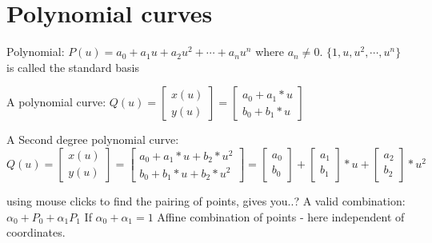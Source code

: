 \section{Polynomial curves}
Polynomial:
$P(u) = a_0 + a_1 u + a_2 u^2 + \cdots + a_nu^n$ where $a_n \not = 0$.
$\{1,u,u^2,\cdots,u^n\}$ is called the standard basis

A polynomial curve: $Q(u) = \begin{bmatrix} x(u) \\ y(u) \end{bmatrix} = \begin{bmatrix}  a_0 + a_1* u \\ b_0 + b_1*u  \end{bmatrix}$

A Second degree polynomial curve: $Q(u) = \begin{bmatrix} x(u) \\ y(u) \end{bmatrix} = \begin{bmatrix}  a_0 + a_1* u + b_2*u^2\\ b_0 + b_1*u + b_2*u^2  \end{bmatrix} = \begin{bmatrix} a_0 \\ b_0  \end{bmatrix} + \begin{bmatrix}a_1 \\ b_1  \end{bmatrix} * u +  \begin{bmatrix} a_2 \\ b_2  \end{bmatrix} *u^2 $

\begin{example}
using mouse clicks to find the pairing of points, gives you..?
A valid combination: $\alpha_0 + P_0 + \alpha_1 P_1$ If $\alpha_0 + \alpha_1 = 1$
Affine combination of points - here independent of coordinates.
\end{example}

